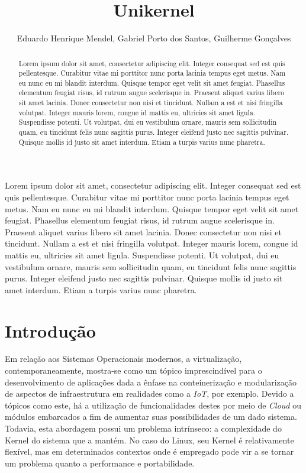 \documentclass[12pt]{article}
\title{Unikernel}
\author{Eduardo Henrique Mendel\inst{1}, Gabriel Porto dos Santos\inst{1}, Guilherme Gonçalves\inst{1}}
\begin{document}
 

\maketitle
\begin{abstract}
Lorem ipsum dolor sit amet, consectetur adipiscing elit. Integer consequat sed est quis pellentesque. Curabitur vitae mi porttitor nunc porta lacinia tempus eget metus. Nam eu nunc eu mi blandit interdum. Quisque tempor eget velit sit amet feugiat. Phasellus elementum feugiat risus, id rutrum augue scelerisque in. Praesent aliquet varius libero sit amet lacinia. Donec consectetur non nisi et tincidunt. Nullam a est et nisi fringilla volutpat. Integer mauris lorem, congue id mattis eu, ultricies sit amet ligula. Suspendisse potenti. Ut volutpat, dui eu vestibulum ornare, mauris sem sollicitudin quam, eu tincidunt felis nunc sagittis purus. Integer eleifend justo nec sagittis pulvinar. Quisque mollis id justo sit amet interdum. Etiam a turpis varius nunc pharetra. 
\end{abstract}
\begin{resumo} 
Lorem ipsum dolor sit amet, consectetur adipiscing elit. Integer consequat sed est quis pellentesque. Curabitur vitae mi porttitor nunc porta lacinia tempus eget metus. Nam eu nunc eu mi blandit interdum. Quisque tempor eget velit sit amet feugiat. Phasellus elementum feugiat risus, id rutrum augue scelerisque in. Praesent aliquet varius libero sit amet lacinia. Donec consectetur non nisi et tincidunt. Nullam a est et nisi fringilla volutpat. Integer mauris lorem, congue id mattis eu, ultricies sit amet ligula. Suspendisse potenti. Ut volutpat, dui eu vestibulum ornare, mauris sem sollicitudin quam, eu tincidunt felis nunc sagittis purus. Integer eleifend justo nec sagittis pulvinar. Quisque mollis id justo sit amet interdum. Etiam a turpis varius nunc pharetra.
\end{resumo}

\section{Introdução}

Em relação aos Sistemas Operacionais modernos, a virtualização, contemporaneamente, mostra-se como um tópico imprescindível para o desenvolvimento de aplicações dada a ênfase na conteinerização e modularização de aspectos de infraestrutura em realidades como a \textit{IoT}, por exemplo. Devido a tópicos como este, há a utilização de funcionalidades destes por meio de \textit{Cloud} ou módulos embarcados a fim de aumentar suas possibilidades de um dado sistema. Todavia, esta abordagem possui um problema intrínseco: a complexidade do Kernel do sistema que a mantém. No caso do Linux, seu Kernel é relativamente flexível, mas em determinados contextos onde é empregado pode vir a se tornar um problema quanto a performance e portabilidade.
\end{document}
